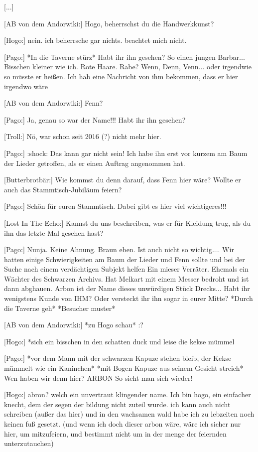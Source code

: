 {[...]

[AB von dem Andorwiki:] Hogo, beherrschst du die Handwerkkunst?

[Hogo:] nein. ich beherrsche gar nichts. beachtet mich nicht.

[Pago:] *In die Taverne stürz* Habt ihr ihn gesehen?
So einen jungen Barbar... Bisschen kleiner wie ich. Rote Haare. Rabe? Wenn, Denn, Venn... oder irgendwie so müsste er heißen. Ich hab eine Nachricht von ihm bekommen, dass er hier irgendwo wäre

[AB von dem Andorwiki:] Fenn?

[Pago:] Ja, genau so war der Name!!! Habt ihr ihn gesehen?

[Troll:] Nö, war schon seit 2016 (?) nicht mehr hier.

[Pago:] :shock: Das kann gar nicht sein! Ich habe ihn erst vor kurzem am Baum der Lieder getroffen, als er einen Auftrag angenommen hat.

[Butterbrotbär:] Wie kommst du denn darauf, dass Fenn hier wäre? Wollte er auch das Stammtisch-Jubiläum feiern?

[Pago:] Schön für euren Stammtisch. Dabei gibt es hier viel wichtigeres!!!

[Lost In The Echo:] Kannst du uns beschreiben, was er für Kleidung trug, als du ihn das letzte Mal gesehen hast?

[Pago:] Nunja. Keine Ahnung. Braun eben. Ist auch nicht so wichtig.... Wir hatten einige Schwierigkeiten am Baum der Lieder und Fenn sollte und bei der Suche nach einem verdächtigen Subjekt helfen
Ein mieser Verräter. Ehemals ein Wächter des Schwarzen Archivs. Hat Melkart mit einem Messer bedroht und ist dann abghauen. Arbon ist der Name dieses unwürdigen Stück Drecks...
Habt ihr wenigstens Kunde von IHM? Oder versteckt ihr ihn sogar in eurer Mitte?
*Durch die Taverne geh* *Besucher muster*

[AB von dem Andorwiki:] *zu Hogo schau* :?

[Hogo:] *sich ein bisschen in den schatten duck und leise die kekse mümmel

[Pago:] *vor dem Mann mit der schwarzen Kapuze stehen bleib, der Kekse mümmelt wie ein Kaninchen* *mit Bogen Kapuze aus seinem Gesicht streich* Wen haben wir denn hier? ARBON So sieht man sich wieder!

[Hogo:] abron? welch ein unvertraut klingender name. Ich bin hogo, ein einfacher knecht, dem der segen der bildung nicht zuteil wurde. ich kann auch nicht schreiben (außer das hier) und in den wachsamen wald habe ich zu lebzeiten noch keinen fuß gesetzt.
(und wenn ich doch dieser arbon wäre, wäre ich sicher nur hier, um mitzufeiern, und bestimmt nicht um in der menge der feiernden unterzutauchen)

}
